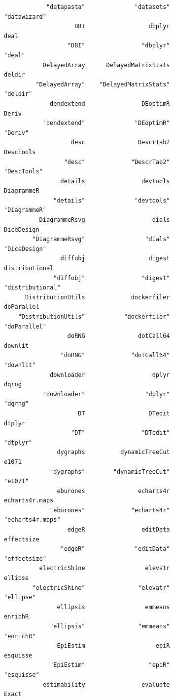 \documentclass[
  letterpaper,
  DIV=11,
  numbers=noendperiod]{scrreprt}
\begin{document}
\begin{verbatim}
            "datapasta"              "datasets"            "datawizard" 
                    DBI                  dbplyr                    deal 
                  "DBI"                "dbplyr"                  "deal" 
           DelayedArray      DelayedMatrixStats                  deldir 
         "DelayedArray"    "DelayedMatrixStats"                "deldir" 
             dendextend                DEoptimR                   Deriv 
           "dendextend"              "DEoptimR"                 "Deriv" 
                   desc               DescrTab2               DescTools 
                 "desc"             "DescrTab2"             "DescTools" 
                details                devtools              DiagrammeR 
              "details"              "devtools"            "DiagrammeR" 
          DiagrammeRsvg                   dials              DiceDesign 
        "DiagrammeRsvg"                 "dials"            "DiceDesign" 
                diffobj                  digest          distributional 
              "diffobj"                "digest"        "distributional" 
      DistributionUtils             dockerfiler              doParallel 
    "DistributionUtils"           "dockerfiler"            "doParallel" 
                  doRNG               dotCall64                 downlit 
                "doRNG"             "dotCall64"               "downlit" 
             downloader                   dplyr                   dqrng 
           "downloader"                 "dplyr"                 "dqrng" 
                     DT                  DTedit                  dtplyr 
                   "DT"                "DTedit"                "dtplyr" 
               dygraphs          dynamicTreeCut                   e1071 
             "dygraphs"        "dynamicTreeCut"                 "e1071" 
               eburones               echarts4r          echarts4r.maps 
             "eburones"             "echarts4r"        "echarts4r.maps" 
                  edgeR                editData              effectsize 
                "edgeR"              "editData"            "effectsize" 
          electricShine                 elevatr                 ellipse 
        "electricShine"               "elevatr"               "ellipse" 
               ellipsis                 emmeans                 enrichR 
             "ellipsis"               "emmeans"               "enrichR" 
               EpiEstim                    epiR                esquisse 
             "EpiEstim"                  "epiR"              "esquisse" 
           estimability                evaluate                   Exact 

\end{verbatim}
\end{document}
